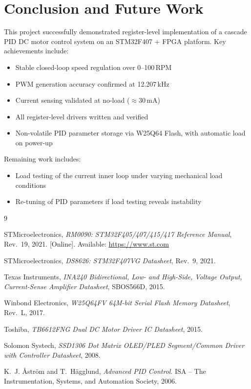 \documentclass[12pt, a4paper]{report}
\begin{document}
\section{Conclusion and Future Work}

This project successfully demonstrated register-level implementation of a
cascade PID DC motor control system on an STM32F407 + FPGA platform.
Key achievements include:

\begin{itemize}
    \item Stable closed-loop speed regulation over 0--100\,RPM
    \item PWM generation accuracy confirmed at 12.207\,kHz
    \item Current sensing validated at no-load ($\approx30$\,mA)
    \item All register-level drivers written and verified
    \item Non-volatile PID parameter storage via W25Q64 Flash,
          with automatic load on power-up
\end{itemize}

Remaining work includes:
\begin{itemize}
    \item Load testing of the current inner loop under varying mechanical
          load conditions
    \item Re-tuning of PID parameters if load testing reveals instability
\end{itemize}


\begin{thebibliography}{9}

STMicroelectronics,
\textit{RM0090: STM32F405/407/415/417 Reference Manual},
Rev.\ 19, 2021. [Online]. Available: \url{https://www.st.com}

STMicroelectronics,
\textit{DS8626: STM32F407VG Datasheet},
Rev.\ 9, 2021.

Texas Instruments,
\textit{INA240 Bidirectional, Low- and High-Side, Voltage Output,
Current-Sense Amplifier Datasheet}, SBOS566D, 2015.

Winbond Electronics,
\textit{W25Q64FV 64M-bit Serial Flash Memory Datasheet},
Rev.\ L, 2017.

Toshiba,
\textit{TB6612FNG Dual DC Motor Driver IC Datasheet},
2015.

Solomon Systech,
\textit{SSD1306 Dot Matrix OLED/PLED Segment/Common Driver with
Controller Datasheet}, 2008.

K.~J. \AA{}str\"{o}m and T.~H\"{a}gglund,
\textit{Advanced PID Control}.
ISA -- The Instrumentation, Systems, and Automation Society, 2006.

\end{thebibliography}
\end{document}
